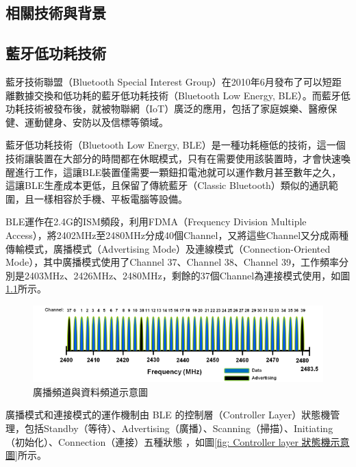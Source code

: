 \begin{ZhChapter}

\chapter{相關技術與背景}

\section{藍牙低功耗技術}

藍牙技術聯盟（Bluetooth Special Interest Group）在2010年6月發布了可以短距離數據交換和低功耗的藍牙低功耗技術（Bluetooth Low Energy, BLE）。而藍牙低功耗技術被發布後，就被物聯網（IoT）廣泛的應用，包括了家庭娛樂、醫療保健、運動健身、安防以及信標等領域。

藍牙低功耗技術（Bluetooth Low Energy, BLE）是一種功耗極低的技術，這一個技術讓裝置在大部分的時間都在休眠模式，只有在需要使用該裝置時，才會快速喚醒進行工作，這讓BLE裝置僅需要一顆鈕扣電池就可以運作數月甚至數年之久，這讓BLE生產成本更低，且保留了傳統藍牙（Classic Bluetooth）類似的通訊範圍，且一樣相容於手機、平板電腦等設備。

BLE運作在2.4G的ISM頻段，利用FDMA（Frequency Division Multiple Access），將2402MHz至2480MHz分成40個Channel，又將這些Channel又分成兩種傳輸模式，廣播模式（Advertising Mode）及連線模式（Connection-Oriented Mode），其中廣播模式使用了Channel 37、Channel 38、Channel 39，工作頻率分別是2403MHz、2426MHz、2480MHz，剩餘的37個Channel為連接模式使用，如圖\ref{fig: 廣播頻道與資料頻道示意圖}所示。

\begin{figure}[H]
    \centering
    \includegraphics[width = 1\textwidth]{image/ble-phy-channel-assignment.png}
    \caption{廣播頻道與資料頻道示意圖\cite{microchip2023}}
    \label{fig: 廣播頻道與資料頻道示意圖}
\end{figure}

廣播模式和連接模式的運作機制由 BLE 的控制層（Controller Layer）狀態機管理，包括Standby（等待）、Advertising（廣播）、Scanning（掃描）、Initiating（初始化）、Connection（連接）五種狀態 ，如圖\ref{fig: Controller layer 狀態機示意圖}所示。


\end{ZhChapter}
